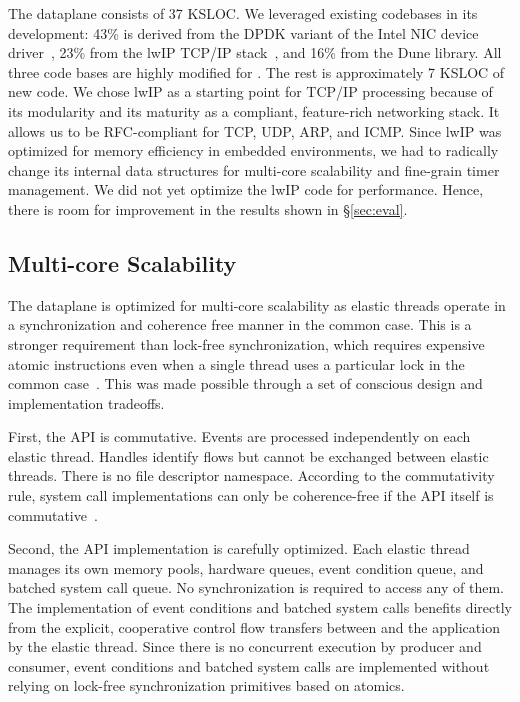 The \ix dataplane consists of 37 KSLOC. We leveraged existing
codebases in its development: 43\% is derived from the DPDK variant of
the Intel NIC device driver~\cite{intel:dpdk}, 23\% from the lwIP TCP/IP
stack~\cite{dunkels2001design}, and 16\% from the Dune library.  All
three code bases are highly modified for \ix. The rest is
approximately 7 KSLOC of new code. We chose lwIP as a starting point
for TCP/IP processing because of its modularity and its maturity as a
compliant, feature-rich networking stack. It allows us to be
RFC-compliant for TCP, UDP, ARP, and ICMP. 
Since lwIP was optimized for memory efficiency in embedded environments, we had to
radically change its internal data structures for multi-core
scalability and fine-grain timer management. We did not yet optimize
the lwIP code for performance. Hence, there is room for improvement in
the results shown in \S\ref{sec:eval}. 


\subsection{Multi-core Scalability}
\label{sec:impl:cohfree}

The \ix dataplane is optimized for multi-core scalability as elastic
threads operate in a synchronization and coherence free manner in the
common case. This is a stronger requirement than lock-free
synchronization, which requires expensive atomic instructions even
when a single thread uses a particular lock in the common
case~\cite{DBLP:conf/sosp/DavidGT13}.  This was made possible 
through a set of conscious design and implementation tradeoffs. 

First, the \ix API is commutative. Events are processed independently
on each elastic thread. Handles identify flows but cannot be exchanged
between elastic threads. There is no file descriptor namespace.
According to the commutativity rule, system call implementations can
only be coherence-free if the API itself is
commutative~\cite{DBLP:conf/sosp/ClementsKZMK13}.

Second, the API implementation is carefully optimized.  Each elastic
thread manages its own memory pools, hardware queues, event condition
queue, and batched system call queue. No synchronization is required
to access any of them. The implementation of event conditions and
batched system calls benefits directly from the explicit, cooperative
control flow transfers between \ix and the application by the elastic
thread.  Since there is no concurrent execution by producer and
consumer, event conditions and batched system calls are implemented
without relying on lock-free synchronization primitives based
on atomics.

